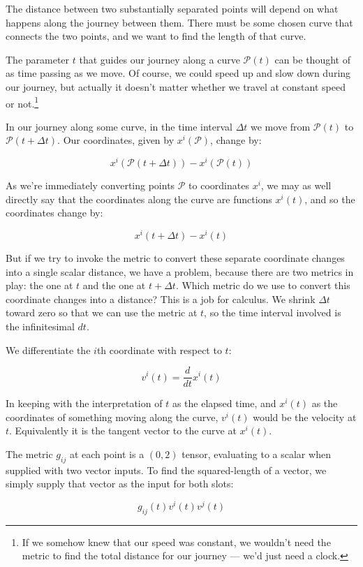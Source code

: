 The distance between two substantially separated points will depend on what happens along the journey between them. There must be some chosen curve that connects the two points, and we want to find the length of that curve.

The parameter $t$ that guides our journey along a curve $\mathcal{P}(t)$ can be thought of as time passing as we move. Of course, we could speed up and slow down during our journey, but actually it doesn't matter whether we travel at constant speed or not.\footnote{If we somehow knew that our speed was constant, we wouldn't need the metric to find the total distance for our journey --- we'd just need a clock.}

In our journey along some curve, in the time interval $\Delta t$ we move from $\mathcal{P}(t)$ to $\mathcal{P}(t + \Delta t)$. Our coordinates, given by $x^i(\mathcal{P})$, change by:

$$
x^i(\mathcal{P}(t + \Delta t))
-
x^i(\mathcal{P}(t))
$$

As we're immediately converting points $\mathcal{P}$ to coordinates $x^i$, we may as well directly say that the coordinates along the curve are functions $x^i(t)$, and so the coordinates change by:

$$
x^i(t + \Delta t)
-
x^i(t)
$$

But if we try to invoke the metric to convert these separate coordinate changes into a single scalar distance, we have a problem, because there are two metrics in play: the one at $t$ and the one at $t + \Delta t$. Which metric do we use to convert this coordinate changes into a distance? This is a job for calculus. We shrink $\Delta t$ toward zero so that we can use the metric at $t$, so the time interval involved is the infinitesimal $dt$.

We differentiate the $i$th coordinate with respect to $t$:

$$
v^i(t) = \frac{d}{dt} x^i(t)
$$

In keeping with the interpretation of $t$ as the elapsed time, and $x^i(t)$ as the coordinates of something moving along the curve, $v^i(t)$ would be the velocity at $t$. Equivalently it is the tangent vector to the curve at $x^i(t)$.

The metric $g_{ij}$ at each point is a $(0, 2)$ tensor, evaluating to a scalar when supplied with two vector inputs. To find the squared-length of a vector, we simply supply that vector as the input for both slots:

$$
g_{ij}(t)
 v^i(t)  
 v^j(t) 
$$


